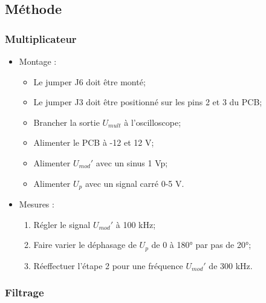 \subsection{Méthode}\label{montage}

\subsubsection{Multiplicateur}
\begin{itemize}
    \item Montage :
    \begin{itemize}
        \item Le jumper J6 doit être monté;
        \item Le jumper J3 doit être positionné sur les pins 2 et 3 du PCB;
        \item Brancher la sortie $U_{mult}$ à l'oscilloscope;
        \item Alimenter le PCB à -12 et 12 V;
        \item Alimenter $U_{mod}'$ avec un sinus 1 Vp;
        \item Alimenter $U_{p}$ avec un signal carré 0-5 V.
    \end{itemize}


    \item Mesures :
    \begin{enumerate}
        \item Régler le signal $U_{mod}'$ à 100 kHz;
        \item Faire varier le déphasage de $U_{p}$ de 0 à 180° par pas de 20°;
        \item Réeffectuer l'étape 2 pour une fréquence  $U_{mod}'$ de 300 kHz.
    \end{enumerate}

\end{itemize}

\subsubsection{Filtrage}

